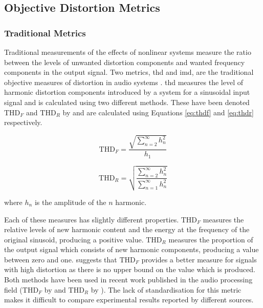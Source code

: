 	\subsection{Objective Distortion Metrics}
	\label{sec:Excitation-Analysis-Metrics}
		\subsubsection*{Traditional Metrics}
			Traditional measurements of the effects of nonlinear systems measure the ratio between the levels
			of unwanted distortion components and wanted frequency components in the output signal. Two
			metrics, \acrfull{thd} and \acrfull{imd}, are the traditional objective measures of distortion in
			audio systems \citep{czerwinski2001multitone1}. \acrshort{thd} measures the level of harmonic
			distortion components introduced by a system for a sinusoidal input signal and is calculated using
			two different methods. These have been denoted $\mathrm{THD}_{F}$ and $\mathrm{THD}_{R}$ by
			\citet{shmilovitz2005on} and are calculated using Equations \ref{eq:thdf} and \ref{eq:thdr}
			respectively.

			\begin{equation}
				\mathrm{THD}_{F} = \frac{\sqrt{\sum_{n = 2}^{\infty} h_{n}^{2}}}{h_{1}}
				\label{eq:thdf}
			\end{equation}

			\begin{equation}
				\mathrm{THD}_{R} = \sqrt{\frac{\sum_{n = 2}^{\infty} h_{n}^{2}}
								       {\sum_{n = 1}^{\infty} h_{n}^{2}}}
				\label{eq:thdr}
			\end{equation}

			where $h_{n}$ is the amplitude of the $n$ harmonic. 

			Each of these measures has slightly different properties. $\mathrm{THD}_{F}$ measures the relative
			levels of new harmonic content and the energy at the frequency of the original sinusoid, producing
			a positive value. $\mathrm{THD}_{R}$ measures the proportion of the output signal which consists of
			new harmonic components, producing a value between zero and one. \citet{shmilovitz2005on} suggests
			that $\mathrm{THD}_{F}$ provides a better measure for signals with high distortion as there is no
			upper bound on the value which is produced.  Both methods have been used in recent work published
			in the audio processing field ($\mathrm{THD}_{F}$ by \citet{fleischmann2014a} and
			$\mathrm{THD}_{R}$ by \citet{dutilleux2011nonlinear}).  The lack of standardisation for this metric
			makes it difficult to compare experimental results reported by different sources.

